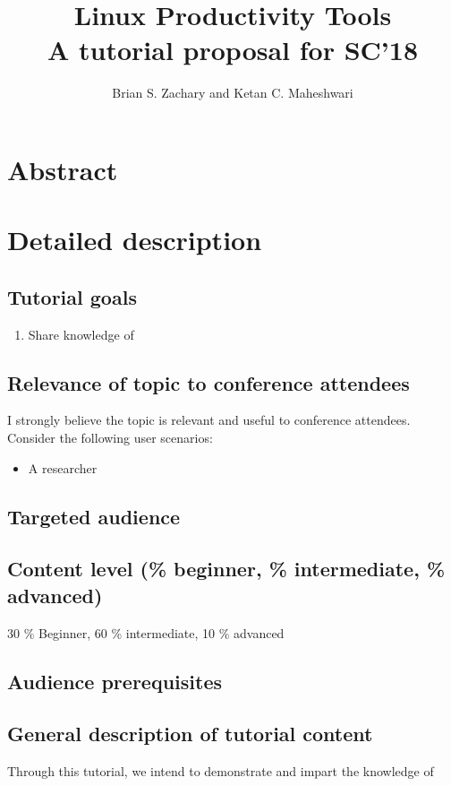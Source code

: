 \documentclass{report}
\title{Linux Productivity Tools \\
       \large A tutorial proposal for SC'18
			 }
\author{Brian S. Zachary and Ketan C. Maheshwari}
\begin{document}
\maketitle
\section*{Abstract}

\section*{Detailed description}
\subsection*{Tutorial goals}
\begin{enumerate}
\item Share knowledge of 
\end{enumerate}

\subsection*{Relevance of topic to conference attendees}
I strongly believe the topic is relevant and useful to conference attendees. Consider the following user scenarios:
\begin{itemize}
\item A researcher 
\end{itemize}

\subsection*{Targeted audience}
\subsection*{Content level (\% beginner, \% intermediate, \% advanced)}
30 \% Beginner, 60 \% intermediate, 10 \% advanced
\subsection*{Audience prerequisites}

\subsection*{General description of tutorial content}
Through this tutorial, we  intend to demonstrate and impart the knowledge of
\end{document}
